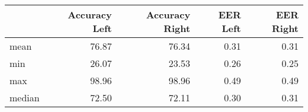 \begin{tabular}{lrrrr}
\toprule
{} &  Accuracy Left &  Accuracy Right &  EER Left &  EER Right \\
\midrule
mean   &          76.87 &           76.34 &      0.31 &       0.31 \\
min    &          26.07 &           23.53 &      0.26 &       0.25 \\
max    &          98.96 &           98.96 &      0.49 &       0.49 \\
median &          72.50 &           72.11 &      0.30 &       0.31 \\
\bottomrule
\end{tabular}
